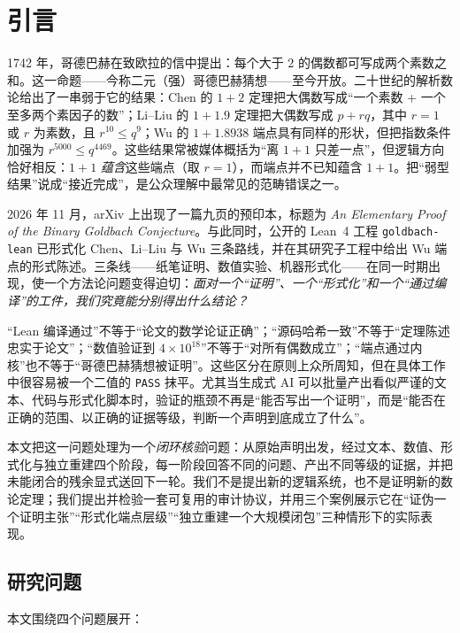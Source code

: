 \documentclass[11pt,a4paper]{ctexart}
\theoremstyle{plain}
\theoremstyle{definition}
\begin{document}
\newpage
\section{引言}
\label{sec:intro}

1742 年，哥德巴赫在致欧拉的信中提出：每个大于 $2$ 的偶数都可写成两个素数之和。这一命题——今称二元（强）哥德巴赫猜想——至今开放。二十世纪的解析数论给出了一串弱于它的结果：Chen 的 $1+2$ 定理把大偶数写成“一个素数 + 一个至多两个素因子的数”\cite{chen1973,chen1978}；Li--Liu 的 $1+1.9$ 定理把大偶数写成 $p+rq$，其中 $r=1$ 或 $r$ 为素数，且 $r^{10}\le q^9$\cite{liliu}；Wu 的 $1+1.8938$ 端点具有同样的形状，但把指数条件加强为 $r^{5000}\le q^{4469}$\cite{upstream}。这些结果常被媒体概括为“离 $1+1$ 只差一点”，但逻辑方向恰好相反：$1+1$ \emph{蕴含}这些端点（取 $r=1$），而端点并不已知蕴含 $1+1$。把“弱型结果”说成“接近完成”，是公众理解中最常见的范畴错误之一。

2026 年 11 月，arXiv 上出现了一篇九页的预印本，标题为 \emph{An Elementary Proof of the Binary Goldbach Conjecture}\cite{qazaqzeh}。与此同时，公开的 Lean~4 工程 \texttt{goldbach-lean} 已形式化 Chen、Li--Liu 与 Wu 三条路线，并在其研究子工程中给出 Wu 端点的形式陈述\cite{upstream}。三条线——纸笔证明、数值实验、机器形式化——在同一时期出现，使一个方法论问题变得迫切：\emph{面对一个“证明”、一个“形式化”和一个“通过编译”的工件，我们究竟能分别得出什么结论？}

“Lean 编译通过”不等于“论文的数学论证正确”；“源码哈希一致”不等于“定理陈述忠实于论文”；“数值验证到 $4\times 10^{18}$”不等于“对所有偶数成立”；“端点通过内核”也不等于“哥德巴赫猜想被证明”。这些区分在原则上众所周知，但在具体工作中很容易被一个二值的 \texttt{PASS} 抹平。尤其当生成式 AI 可以批量产出看似严谨的文本、代码与形式化脚本时，验证的瓶颈不再是“能否写出一个证明”，而是“能否在正确的范围、以正确的证据等级，判断一个声明到底成立了什么”。

本文把这一问题处理为一个\emph{闭环核验}问题：从原始声明出发，经过文本、数值、形式化与独立重建四个阶段，每一阶段回答不同的问题、产出不同等级的证据，并把未能闭合的残余显式送回下一轮。我们不是提出新的逻辑系统，也不是证明新的数论定理；我们提出并检验一套可复用的审计协议，并用三个案例展示它在“证伪一个证明主张”“形式化端点层级”“独立重建一个大规模闭包”三种情形下的实际表现。

\subsection{研究问题}
\label{sec:rq}

本文围绕四个问题展开：
\end{document}
